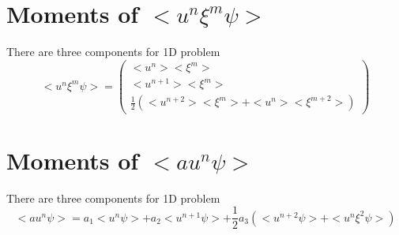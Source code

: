 \documentclass[a4paper]{book}
\begin{document}
\begin{appendices}
    \section*{Moments of $<u^n\xi^m\psi>$}
    There are three components for 1D problem
    $$
    <u^n\xi^m\psi>=\begin{pmatrix}
        <u^n><\xi^m>\\
        <u^{n+1}><\xi^m>\\
        \frac{1}{2}\left(<u^{n+2}><\xi^m>+<u^n><\xi^{m+2}>\right)
    \end{pmatrix} 
    $$

    \section*{Moments of $<au^n\psi>$}
    There are three components for 1D problem
    $$<au^n\psi>=a_1<u^n\psi>+a_2<u^{n+1}\psi>+\frac{1}{2}a_3\left(<u^{n+2}\psi>+<u^n\xi^2\psi>\right)$$
\end{appendices}

\cleardoublepage
{}
{}


\end{document}
